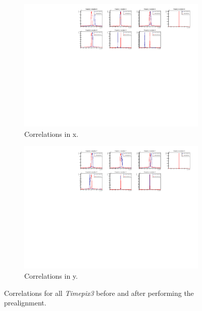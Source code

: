 \documentclass[a4paper,11pt]{article}
\newcommand*{\tpx}{\emph{Timepix3}\xspace}
\begin{document}
\begin{figure}[!htb]
\begin{subfigure}{\textwidth}
\centering
\includegraphics[width=\textwidth]{05_prealignment_X}
\caption{Correlations in x.}
\label{fig:05_prealignment_X}
\end{subfigure}
\begin{subfigure}{\textwidth}
\centering
\includegraphics[width=\textwidth]{05_prealignment_Y}
\caption{Correlations in y.}
\label{fig:05_prealignment_Y}
\end{subfigure}
\caption{Correlations for all \tpx before and after performing the prealignment.}
\label{fig:05_prealignment}
\end{figure}

\newpage
\end{document}
